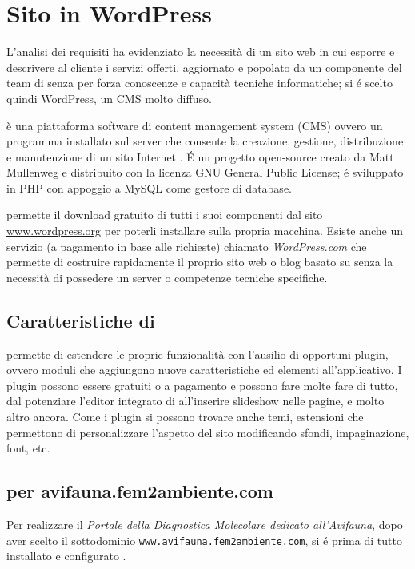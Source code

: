 \chapter{Sito in WordPress}
\label{chp:wp}

L'analisi dei requisiti ha evidenziato la necessità di un sito web in cui esporre e descrivere al cliente i servizi offerti, aggiornato e popolato da un componente del team di {\fem} senza per forza conoscenze e capacità tecniche informatiche; si é scelto quindi WordPress, un CMS molto diffuso.

{\wp} è una piattaforma software di content management system (CMS) ovvero un programma installato sul server che consente la creazione, gestione, distribuzione e manutenzione di un sito Internet \cite{wordpress}. É un progetto open-source creato da Matt Mullenweg e distribuito con la licenza GNU General Public License; é sviluppato in PHP con appoggio a MySQL come gestore di database.

{\wp} permette il download gratuito di tutti i suoi componenti dal sito \url{www.wordpress.org} per poterli installare sulla propria macchina. Esiste anche un servizio (a pagamento in base alle richieste) chiamato \emph{WordPress.com} che permette di costruire rapidamente il proprio sito web o blog basato su {\wp} senza la necessità di possedere un server o competenze tecniche specifiche.

\section{Caratteristiche di {\wp}}
{\wp} permette di estendere le proprie funzionalità con l'ausilio di opportuni plugin, ovvero moduli che aggiungono nuove caratteristiche ed elementi all'applicativo. I plugin possono essere gratuiti o a pagamento e possono fare molte fare di tutto, dal potenziare l'editor integrato di {\wp} all'inserire slideshow nelle pagine, e molto altro ancora. Come i plugin si possono trovare anche temi, estensioni che permettono di personalizzare l'aspetto del sito modificando sfondi, impaginazione, font, etc.

\section{{\wp} per avifauna.fem2ambiente.com}
Per realizzare il \emph{Portale della Diagnostica Molecolare dedicato all'Avifauna}, dopo aver scelto il sottodominio \texttt{www.avifauna.fem2ambiente.com}, si é prima di tutto installato e configurato {\wp}.

